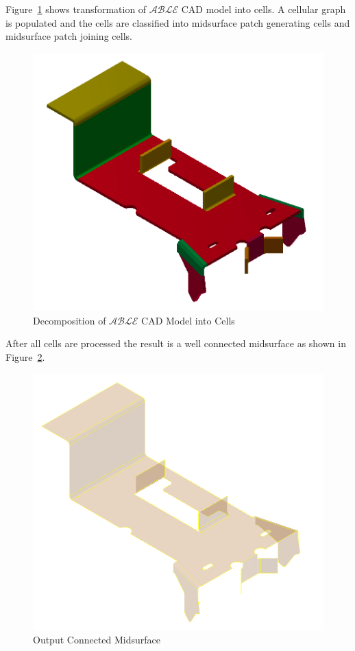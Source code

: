 Figure~\ref{fig:results:stdbracketdecomp} shows transformation of $\mathcal{ABLE}$ CAD model into cells. A cellular graph is populated and the cells are classified into midsurface patch generating cells and midsurface patch joining cells.


\begin{figure}[!h]
\centering     %
\includegraphics[width=0.62\linewidth,valign=t]{images/CommercialBracket_post_decomposition_model}
\caption{Decomposition of $\mathcal{ABLE}$ CAD Model into Cells}
\label{fig:results:stdbracketdecomp}
\end{figure}


After all cells are processed the result is a well connected midsurface as shown in Figure~\ref{fig:results:stdbracketdmidsurf}.


\begin{figure}[!h]
\centering     %
\includegraphics[width=0.62\linewidth,valign=t]{images/CommercialBracket_midsurfcelljoin_model}
\caption{Output Connected Midsurface}
\label{fig:results:stdbracketdmidsurf}
\end{figure}

